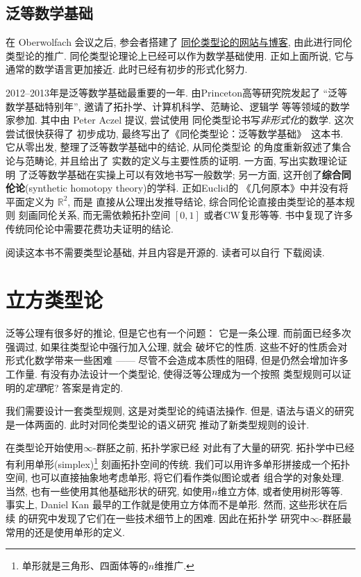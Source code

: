 \subsection{泛等数学基础}
在 Oberwolfach 会议之后, 参会者搭建了%
\href{http://homotopytypetheory.org/}{同伦类型论的网站与博客},
由此进行同伦类型论的推广.
同伦类型论理论上已经可以作为数学基础使用. 正如上面所说, 它与
通常的数学语言更加接近. 此时已经有初步的形式化努力.

2012--2013年是泛等数学基础最重要的一年. 由Princeton高等研究院发起了
“泛等数学基础特别年”, 邀请了拓扑学、计算机科学、范畴论、逻辑学
等等领域的数学家参加. 其中由 Peter Aczel 提议, 尝试使用
同伦类型论书写\emph{非形式化}的数学. 这次尝试很快获得了
初步成功, 最终写出了《同伦类型论：泛等数学基础》~\cite{ufp:2013:hottbook}这本书.
它从零出发, 整理了泛等数学基础中的结论, 从同伦类型论
的角度重新叙述了集合论与范畴论, 并且给出了
实数的定义与主要性质的证明. 一方面, 写出实数理论证明
了泛等数学基础在实操上可以有效地书写一般数学; 另一方面,
这开创了\textbf{综合同伦论}(synthetic homotopy theory)的学科. 正如Euclid的
《几何原本》中并没有将平面定义为 \(\mathbb R^2\), 而是
直接从公理出发推导结论, 综合同伦论直接由类型论的基本规则
刻画同伦关系, 而无需依赖拓扑空间 \([0,1]\) 或者CW复形等等.
书中复现了许多传统同伦论中需要花费功夫证明的结论.

阅读这本书不需要类型论基础, 并且内容是开源的. 读者可以自行
下载阅读.

\section{立方类型论}

泛等公理有很多好的推论, 但是它也有一个问题： 它是一条公理.
而前面已经多次强调过, 如果往类型论中强行加入公理, 就会
破坏它的性质. 这些不好的性质会对形式化数学带来一些困难
------ 尽管不会造成本质性的阻碍, 但是仍然会增加许多工作量.
有没有办法设计一个类型论, 使得泛等公理成为一个按照
类型规则可以证明的\emph{定理}呢? 答案是肯定的.

我们需要设计一套类型规则, 这是对类型论的纯语法操作. 但是,
语法与语义的研究是一体两面的. 此时对同伦类型论的语义研究
推动了新类型规则的设计.

在类型论开始使用\(\infty\)-群胚之前, 拓扑学家已经
对此有了大量的研究. 拓扑学中已经有利用单形(simplex)\footnote{单形就是三角形、四面体等的\(n\)维推广.}
刻画拓扑空间的传统. 我们可以用许多单形拼接成一个拓扑空间,
也可以直接抽象地考虑单形, 将它们看作类似图论或者
组合学的对象处理. 当然, 也有一些使用其他基础形状的研究,
如使用\(n\)维立方体, 或者使用树形等等. 事实上, Daniel Kan
最早的工作就是使用立方体而不是单形. 然而, 这些形状在后续
的研究中发现了它们在一些技术细节上的困难. 因此在拓扑学
研究中\(\infty\)-群胚最常用的还是使用单形的定义.

